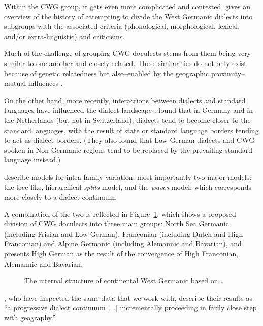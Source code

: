 \documentclass[a4paper]{article}
\begin{document}
Within the CWG group, it gets even more complicated and contested.
\citet[pp. 72-80]{nielsen1989germanic} gives an overview of the history of attempting to divide the West Germanic dialects into subgroups with the associated criteria (phonological, morphological, lexical, and/or extra-linguistic) and criticisms.

Much of the challenge of grouping CWG doculects stems from
them being very similar to one another and closely related.
These similarities do not only exist because of genetic relatedness
but also--enabled by the geographic proximity--mutual influences
\citep[p. 8]{harbert2007germanic}.

On the other hand,
more recently,
interactions between dialects and standard languages
have influenced the dialect landscape
\citep{coetsem1992interaction}.
\citet{kremer1990einfuehrung} found that in Germany and in the Netherlands
(but not in Switzerland), dialects tend to become closer to the standard languages,
with the result of state or standard language borders tending to act as dialect borders.
(They also found that Low German dialects and CWG spoken in
Non-Germanic regions tend to be replaced by the prevailing standard language instead.)

\citet{heggarty2010splits} describe models for intra-family variation,
most importantly two major models:
the tree-like, hierarchical \textit{splits} model,
and the \textit{waves} model, which corresponds more closely to a dialect continuum.

A combination of the two is reflected in
Figure~\ref{fig:cwg_harbert},
which shows a proposed division of CWG doculects
into three main groups: North Sea Germanic (including Frisian and Low German),
Franconian (including Dutch and High Franconian)
and Alpine Germanic (including Alemannic and Bavarian),
and presents High German as the result of the convergence
of High Franconian, Alemannic and Bavarian.

\begin{figure}[b]
\centering

\caption{
The internal structure of continental West Germanic
based on \citet[p. 8]{harbert2007germanic}.
}
\label{fig:cwg_harbert}
\end{figure}

\citet{heggarty2010splits}, who have inspected the same data
that we work with, describe their results as
``a progressive dialect continuum [...] incrementally proceeding in fairly close step
with geography.''
\end{document}

